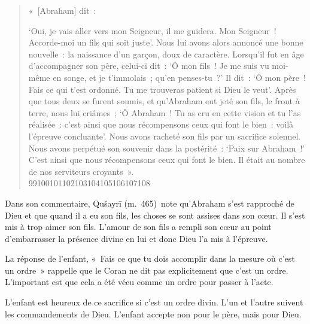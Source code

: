 \begin{quote}
«~{[}Abraham{]} dit~:

`Oui, je vais aller vers mon Seigneur, il me guidera. Mon Seigneur~!
Accorde-moi un fils qui soit juste'. Nous lui avons alors annoncé une
bonne nouvelle~: la naissance d'un garçon, doux de caractère. Lorsqu'il
fut en âge d'accompagner son père, celui-ci dit~: `Ô mon fils~! Je me
suis vu moi-même en songe, et je t'immolais~; qu'en penses-tu~?' Il
dit~: `Ô mon père~! Fais ce qui t'est ordonné. Tu me trouveras patient
si Dieu le veut'. Après que tous deux se furent soumis, et qu'Abraham
eut jeté son fils, le front à terre, nous lui criâmes~; `Ô Abraham~! Tu
as cru en cette vision et tu l'as réalisée~: c'est ainsi que nous
récompensons ceux qui font le bien~: voilà l'épreuve concluante'. Nous
avons racheté son fils par un sacrifice solennel. Nous avons perpétué
son souvenir dans la postérité~: `Paix sur Abraham~!' C'est ainsi que
nous récompensons ceux qui font le bien. Il était au nombre de nos
serviteurs croyants~». \\


99100101102103104105106107108
\end{quote}
Dans son commentaire, Qušayrī (m.~465)~note qu'Abraham s'est rapproché
de Dieu et que quand il a eu son fils, les choses se sont assises dans
son cœur. Il s'est mis à trop aimer son fils. L'amour de son fils a
rempli son cœur au point d'embarrasser la présence divine en lui et donc
Dieu l'a mis à l'épreuve.

La réponse de l'enfant, «~Fais ce que tu dois accomplir dans la mesure
où c'est un ordre~» rappelle que le Coran ne dit pas explicitement que
c'est un ordre. L'important est que cela a été vécu comme un ordre pour
passer à l'acte.

L'enfant est heureux de ce sacrifice si c'est un ordre divin. L'un et
l'autre suivent les commandements de Dieu. L'enfant accepte non pour le
père, mais pour Dieu.


